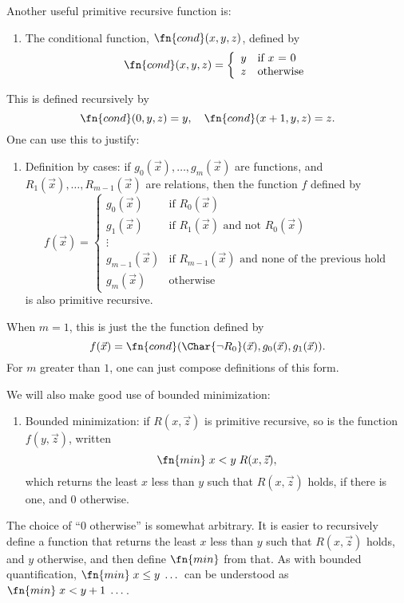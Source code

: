 \documentclass[../../include/open-logic-section]{subfiles}
\begin{document}
Another useful primitive recursive function is:
\begin{enumerate}
\item The conditional function, $\fn{cond}(x,y,z)$, defined by
\[
\fn{cond}(x,y,z) = \left\{ \begin{array}{ll}
  y & \mbox{if $x$ = 0} \\
  z & \mbox{otherwise}
\end{array}\right.
\]
\end{enumerate}
This is defined recursively by
\[
\fn{cond}(0,y,z) = y, \quad \fn{cond}(x+1,y,z) = z.
\]
One can use this to justify:
\begin{enumerate}
\item Definition by cases: if $g_0(\vec x), \dots, g_m(\vec x)$ are
functions, and $R_1(\vec x), \dots, R_{m-1}(\vec x)$ are relations, then
the function $f$ defined by
\[
f(\vec x) = \left\{\begin{array}{ll}
    g_0(\vec x) & \mbox{if $R_0(\vec{x})$} \\
    g_1(\vec x) & \mbox{if $R_1(\vec{x})$ and not $R_0(\vec{x})$} \\
    \vdots & \\
    g_{m-1}(\vec x) & \mbox{if $R_{m-1}(\vec{x})$ and none of the
      previous hold}
    \\
    g_m(\vec x) & \mbox{otherwise}
\end{array}\right.
\]
is also primitive recursive.
\end{enumerate}
When $m = 1$, this is just the the function defined by 
\[
f(\vec x) = \fn{cond}(\Char{\lnot R_0}(\vec x),g_0(\vec x),g_1(\vec
 x)).
\]
For $m$ greater than $1$, one can just compose definitions of this
form. 

We will also make good use of bounded minimization:
\begin{enumerate}
\item Bounded minimization: if $R(x, \vec z)$ is primitive recursive,
  so is the function $f(y, \vec z)$, written 
\[
\fn{min} \; x < y \; R(x, \vec z),
\]
which returns the least $x$ less than $y$ such that $R(x,\vec z)$
holds, if there is one, and 0 otherwise.
\end{enumerate}

\begin{explain}
The choice of ``$0$ otherwise'' is somewhat arbitrary. It is easier to
recursively define a function that returns the least $x$ less than $y$
such that $R(x,\vec z)$ holds, and $y$ otherwise, and then define
$\fn{min}$ from that. As with bounded quantification, $\fn{min} \; x
\leq y \; \dots$ can be understood as $\fn{min} \; x < y + 1 \;
\dots$.
\end{explain}
\end{document}
